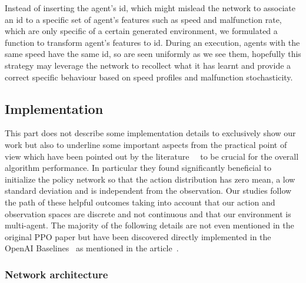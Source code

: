 \documentclass[11pt, a4paper, hidelinks]{report}
\begin{document}
Instead of inserting the agent's id, which might mislead the network to associate an id to a specific set of agent's features such as speed and malfunction rate, which are only specific of a certain generated environment, we formulated a function to transform agent's features to id.
During an execution, agents with the same speed have the same id, so are seen uniformly as we see them, hopefully this strategy may leverage the network to recollect what it has learnt and provide a correct specific behaviour based on speed profiles and malfunction stochasticity.

\subsection{Implementation}\label{subsec:implementation}

This part does not describe some implementation details to exclusively show our work but also to underline some important aspects from the practical point of view which have been pointed out by the literature~\citep{ppo-implementation-1}~\citep{ppo-implementation-2} to be crucial for the overall algorithm performance.
In particular they found significantly beneficial to initialize the policy network so that the action distribution has zero mean, a low standard deviation and is independent from the observation.
Our studies follow the path of these helpful outcomes taking into account that our action and observation spaces are discrete and not continuous and that our environment is multi-agent.
The majority of the following details are not even mentioned in the original PPO paper but have been discovered directly implemented in the OpenAI Baselines~\citep{ppo-baselines} as mentioned in the article~\citep{ppo-32-implementations-details}.

\subsubsection{Network architecture}\label{subsubsec:network-architecture}
\end{document}
